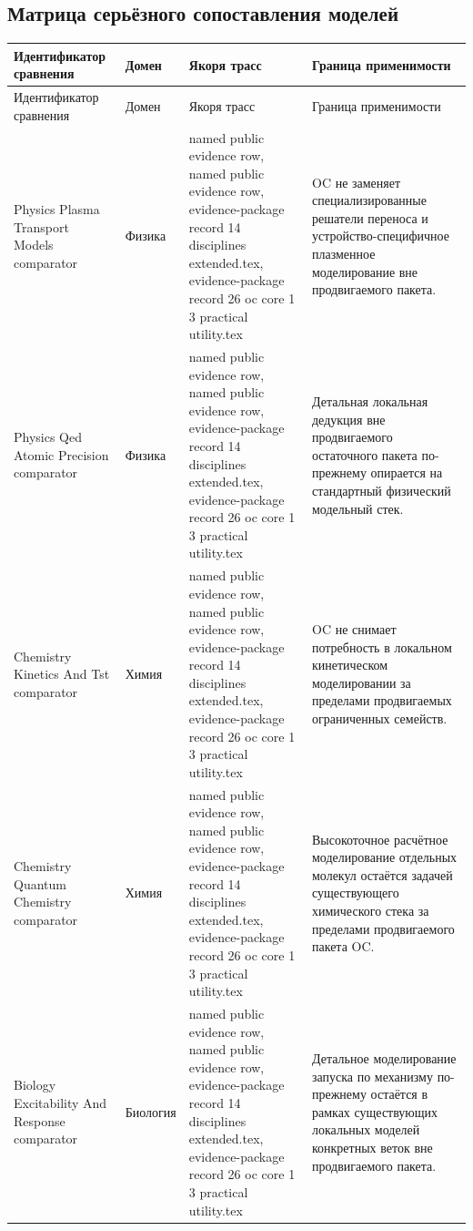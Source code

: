 \subsection{Матрица серьёзного сопоставления моделей}
\begin{longtable}{@{}L{0.20\textwidth}L{0.11\textwidth}L{0.33\textwidth}L{0.28\textwidth}@{}}
\toprule
Идентификатор сравнения & Домен & Якоря трасс & Граница применимости \\
\midrule
\endfirsthead
\toprule
Идентификатор сравнения & Домен & Якоря трасс & Граница применимости \\
\midrule
\endhead
Physics Plasma Transport Models comparator & Физика & named public evidence row, named public evidence row, \allowbreak evidence-package record 14 disciplines extended.tex, \allowbreak evidence-package record 26 oc core 1 3 practical utility.tex & OC не заменяет специализированные решатели переноса и устройство-специфичное плазменное моделирование вне продвигаемого пакета. \\
Physics Qed Atomic Precision comparator & Физика & named public evidence row, named public evidence row, \allowbreak evidence-package record 14 disciplines extended.tex, \allowbreak evidence-package record 26 oc core 1 3 practical utility.tex & Детальная локальная дедукция вне продвигаемого остаточного пакета по-прежнему опирается на стандартный физический модельный стек. \\
Chemistry Kinetics And Tst comparator & Химия & named public evidence row, named public evidence row, \allowbreak evidence-package record 14 disciplines extended.tex, \allowbreak evidence-package record 26 oc core 1 3 practical utility.tex & OC не снимает потребность в локальном кинетическом моделировании за пределами продвигаемых ограниченных семейств. \\
Chemistry Quantum Chemistry comparator & Химия & named public evidence row, named public evidence row, \allowbreak evidence-package record 14 disciplines extended.tex, \allowbreak evidence-package record 26 oc core 1 3 practical utility.tex & Высокоточное расчётное моделирование отдельных молекул остаётся задачей существующего химического стека за пределами продвигаемого пакета OC. \\
Biology Excitability And Response comparator & Биология & named public evidence row, named public evidence row, \allowbreak evidence-package record 14 disciplines extended.tex, \allowbreak evidence-package record 26 oc core 1 3 practical utility.tex & Детальное моделирование запуска по механизму по-прежнему остаётся в рамках существующих локальных моделей конкретных веток вне продвигаемого пакета. \\

\end{longtable}
